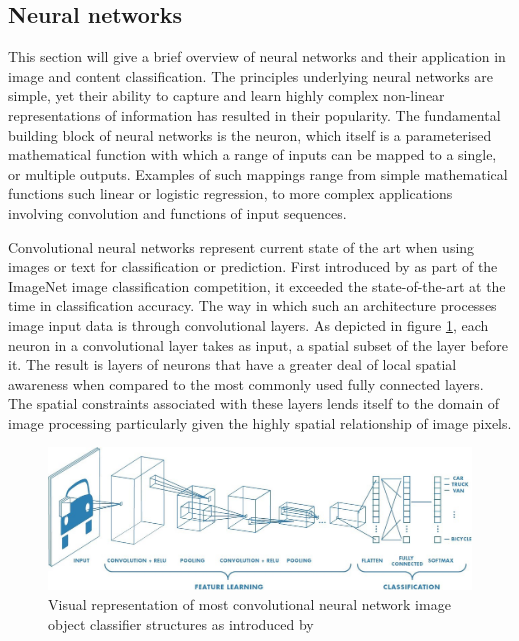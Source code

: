 \documentclass{article}
\begin{document}
\subsection{Neural networks} \label{sec:neural-network-overview}

This section will give a brief overview of neural networks and their application in image and content classification.
The principles underlying neural networks are simple, yet their ability to capture and learn highly complex non-linear representations of information has resulted in their popularity.
The fundamental building block of neural networks is the neuron, which itself is a parameterised mathematical function with which a range of inputs can be mapped to a single, or multiple outputs.
Examples of such mappings range from simple mathematical functions such linear or logistic regression, to more complex applications involving convolution and functions of input sequences.

Convolutional neural networks represent current state of the art when using images or text for classification or prediction.
First introduced by \citet{krizhevsky2012imagenet} as part of the ImageNet image classification competition, it exceeded the state-of-the-art at the time in classification accuracy.
The way in which such an architecture processes image input data is through convolutional layers.
As depicted in figure \ref{fig:CNN}, each neuron in a convolutional layer takes as input, a spatial subset of the layer before it.
The result is layers of neurons that have a greater deal of local spatial awareness when compared to the most commonly used fully connected layers.
The spatial constraints associated with these layers lends itself to the domain of image processing particularly given the highly spatial relationship of image pixels.

\begin{figure}[h!]
	\includegraphics[width=\textwidth]{images/convolutional-neural-network.jpg}
	\caption{Visual representation of most convolutional neural network image object classifier structures as introduced by \citet{krizhevsky2012imagenet}}
	\label{fig:CNN}
\end{figure}
\end{document}
